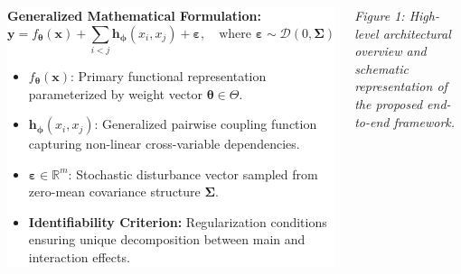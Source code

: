 \documentclass[25pt, a0paper, portrait]{tikzposter}
\begin{document}
\begin{columns}
{  \begin{center}
    \setlength{\fboxsep}{14pt}
    \colorbox{white}{%
      \begin{minipage}{0.94\linewidth}
        \textbf{Generalized Mathematical Formulation:}
        \vspace{-0.2em}
        \[
          \mathbf{y} = f_{\boldsymbol{\theta}}(\mathbf{x}) + \sum_{i < j} \mathbf{h}_{\boldsymbol{\phi}}(x_i, x_j) + \boldsymbol{\varepsilon}, \quad \text{where } \boldsymbol{\varepsilon} \sim \mathcal{D}(0, \boldsymbol{\Sigma})
        \]
        \begin{itemize}\setlength{\itemsep}{0.25em}
          \item $f_{\boldsymbol{\theta}}(\mathbf{x})$: Primary functional representation parameterized by weight vector $\boldsymbol{\theta} \in \Theta$.
          \item $\mathbf{h}_{\boldsymbol{\phi}}(x_i, x_j)$: Generalized pairwise coupling function capturing non-linear cross-variable dependencies.
          \item $\boldsymbol{\varepsilon} \in \mathbb{R}^m$: Stochastic disturbance vector sampled from zero-mean covariance structure $\boldsymbol{\Sigma}$.
          \item \textbf{Identifiability Criterion:} Regularization conditions ensuring unique decomposition between main and interaction effects.
        \end{itemize}
      \end{minipage}%
    }
  \end{center}
  \vspace{0.4em}
  
  \begin{center}
    \vspace{0.3em}
    \small \textit{Figure 1: High-level architectural overview and schematic representation of the proposed end-to-end framework.}
  \end{center}
}


\end{columns}
\end{document}
